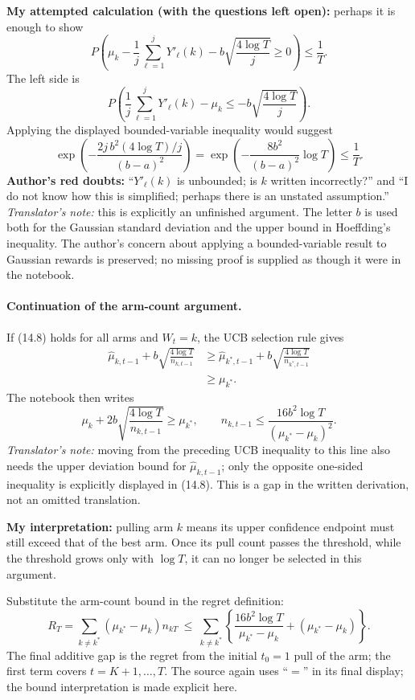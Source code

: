 \textbf{My attempted calculation (with the questions left open):} perhaps it is enough to show
\[
 P\left(\mu_k-\frac1j\sum_{\ell=1}^jY'_\ell(k)
 -b\sqrt{\frac{4\log T}{j}}\ge0\right)\le\frac1T.
\]
The left side is
\[
 P\left(\frac1j\sum_{\ell=1}^jY'_\ell(k)-\mu_k
 \le-b\sqrt{\frac{4\log T}{j}}\right).
\]
Applying the displayed bounded-variable inequality would suggest
\[
 \exp\left(-\frac{2j\,b^2(4\log T)/j}{(b-a)^2}\right)
 =\exp\left(-\frac{8b^2}{(b-a)^2}\log T\right)
 \le\frac1T.
\]
\textbf{Author's red doubts:} ``$Y'_\ell(k)$ is unbounded; is $k$ written incorrectly?'' and ``I do not know how this is simplified; perhaps there is an unstated assumption.''
\textit{Translator's note:} this is explicitly an unfinished argument. The letter $b$ is used both for the Gaussian standard deviation and the upper bound in Hoeffding's inequality. The author's concern about applying a bounded-variable result to Gaussian rewards is preserved; no missing proof is supplied as though it were in the notebook.

\paragraph{Continuation of the arm-count argument.}
If (14.8) holds for all arms and $W_t=k$, the UCB selection rule gives
\begin{align*}
 \widehat\mu_{k,t-1}+b\sqrt{\frac{4\log T}{n_{k,t-1}}}
 &\ge\widehat\mu_{k^*,t-1}+b\sqrt{\frac{4\log T}{n_{k^*,t-1}}}\\
 &\ge\mu_{k^*}.
\end{align*}
The notebook then writes
\[
 \mu_k+2b\sqrt{\frac{4\log T}{n_{k,t-1}}}\ge\mu_{k^*},
 \qquad
 n_{k,t-1}\le\frac{16b^2\log T}{(\mu_{k^*}-\mu_k)^2}.
\]
\textit{Translator's note:} moving from the preceding UCB inequality to this line also needs the upper deviation bound for $\widehat\mu_{k,t-1}$; only the opposite one-sided inequality is explicitly displayed in (14.8). This is a gap in the written derivation, not an omitted translation.

\textbf{My interpretation:} pulling arm $k$ means its upper confidence endpoint must still exceed that of the best arm. Once its pull count passes the threshold, while the threshold grows only with $\log T$, it can no longer be selected in this argument.

Substitute the arm-count bound in the regret definition:
\[
 R_T=\sum_{k\ne k^*}(\mu_{k^*}-\mu_k)n_{kT}
 \ \le\ \sum_{k\ne k^*}\left\{
 \frac{16b^2\log T}{\mu_{k^*}-\mu_k}+(\mu_{k^*}-\mu_k)\right\}.
\]
The final additive gap is the regret from the initial $t_0=1$ pull of the arm; the first term covers $t=K+1,\ldots,T$. The source again uses ``$=$'' in its final display; the bound interpretation is made explicit here.

